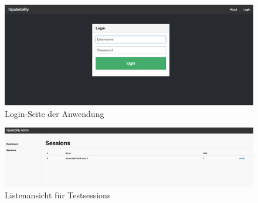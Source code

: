 \begin{figure}[h!]
	\centering
		\includegraphics[width=\linewidth,keepaspectratio]{img/login-page.png}
	\caption{Login-Seite der Anwendung}
	\label{fig: login-page}
\end{figure}
\newpage
\begin{figure}[h!]
	\centering
		\includegraphics[width=\linewidth,keepaspectratio]{img/sessions-page.png}
	\caption{Listenansicht für Testsessions}
	\label{fig: sessions-page}
\end{figure}

